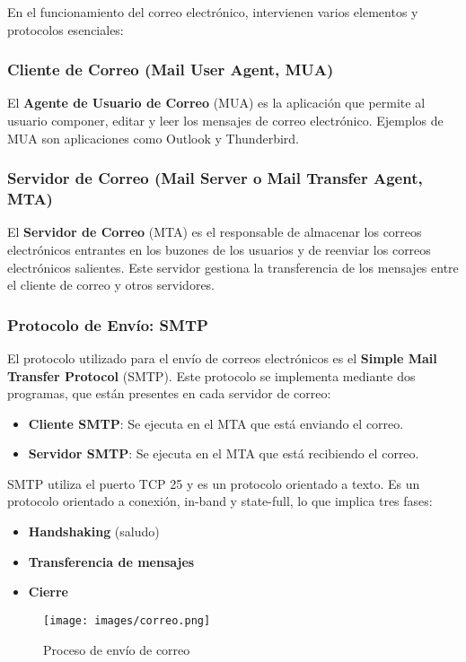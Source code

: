 \documentclass[a4paper,12pt]{article}
\begin{document}
En el funcionamiento del correo electrónico, intervienen varios elementos y protocolos esenciales:

\subsubsection{Cliente de Correo (Mail User Agent, MUA)}
El \textbf{Agente de Usuario de Correo} (MUA) es la aplicación que permite al usuario componer, editar y leer los mensajes de correo electrónico. Ejemplos de MUA son aplicaciones como Outlook y Thunderbird.

\subsubsection{Servidor de Correo (Mail Server o Mail Transfer Agent, MTA)}
El \textbf{Servidor de Correo} (MTA) es el responsable de almacenar los correos electrónicos entrantes en los buzones de los usuarios y de reenviar los correos electrónicos salientes. Este servidor gestiona la transferencia de los mensajes entre el cliente de correo y otros servidores.

\subsubsection{Protocolo de Envío: SMTP}
El protocolo utilizado para el envío de correos electrónicos es el \textbf{Simple Mail Transfer Protocol} (SMTP). Este protocolo se implementa mediante dos programas, que están presentes en cada servidor de correo:

\begin{itemize}
    \item \textbf{Cliente SMTP}: Se ejecuta en el MTA que está enviando el correo.
    \item \textbf{Servidor SMTP}: Se ejecuta en el MTA que está recibiendo el correo.
\end{itemize}

SMTP utiliza el puerto TCP 25 y es un protocolo orientado a texto. Es un protocolo orientado a conexión, in-band y state-full, lo que implica tres fases:

\begin{itemize}
    \item \textbf{Handshaking} (saludo)
    \item \textbf{Transferencia de mensajes}
    \item \textbf{Cierre}
\end{itemize}
\begin{figure}[H]
    \centering
    \texttt{[image: images/correo.png]}
    \caption{Proceso de envío de correo}
    \label{fig:correo}
\end{figure}
\end{document}
